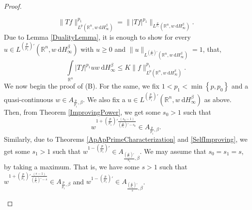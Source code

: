 \documentclass{amsart}
\numberwithin{theorem}{section}
\numberwithin{equation}{section}
\begin{document}
\begin{proof}
\begin{enumerate}
				$$\| Tf \|_{L^p \left( \mathbb{R}^n, w \ \mathrm{d}H^{\beta}_{\infty} \right)}^{p_1} = \| |Tf|^{p_1} \|_{L^{\frac{p}{p_1}} \left( \mathbb{R}^n, w \ \mathrm{d}H^{\beta}_{\infty} \right)}.$$
				Due to Lemma \ref{DualityLemma}, it is enough to show for every $u \in L^{\left( \frac{p}{p_1} \right)'} \left( \mathbb{R}^n, w \ \mathrm{d}H^{\beta}_{\infty} \right)$ with $u \geq 0$ and $\| u \|_{L^{\left( \frac{p}{p_1} \right)'} \left( \mathbb{R}^n, w \ \mathrm{d}H^{\beta}_{\infty} \right)} = 1$, that,
				$$\int\limits_{\mathbb{R}^n} \left| Tf \right|^{p_1} u w \ \mathrm{d}H^{\beta}_{\infty} \leq K \| f \|_{L^p \left( \mathbb{R}^n, w \ \mathrm{d}H^{\beta}_{\infty} \right)}^{p_1}.$$
				We now begin the proof of (B). For the same, we fix $1 < p_1 < \min \left\lbrace p, p_0 \right\rbrace$ and a quasi-continuous $w \in A_{\frac{p}{p_1}, \beta}$. We also fix a $u \in L^{\left( \frac{p}{p_1} \right)'} \left( \mathbb{R}^n, w \ \mathrm{d}H^{\beta}_{\infty} \right)$ as above. Then, from Theorem \ref{ImprovingPower}, we get some $s_0 > 1$ such that 
				$$w^{1 + \left( \frac{p}{p_1} \right)' \frac{\left( s_0 - 1 \right)}{\left( \frac{p}{p_1} \right)' - s_0}} \in A_{\frac{p}{p_1}, \beta}.$$
				Similarly, due to Theorems \ref{ApApPrimeCharacterization} and \ref{SelfImproving}, we get some $s_1 > 1$ such that $w^{1 - \left( \frac{p}{p_1} \right)'} \in A_{\frac{\left( \frac{p}{p_1} \right)'}{s_1}, \beta}$. We may assume that $s_0 = s_1 = s$, by taking a maximum. That is, we have some $s > 1$ such that $w^{1 + \left( \frac{p}{p_1} \right)' \frac{\left( s - 1 \right)}{\left( \frac{p}{p_1} \right)' - s}} \in A_{\frac{p}{p_1}, \beta}$ and $w^{1 - \left( \frac{p}{p_1} \right)'} \in A_{\frac{\left( \frac{p}{p_1} \right)'}{s}, \beta}$.
				

\end{enumerate}
\end{proof}
\end{document}
